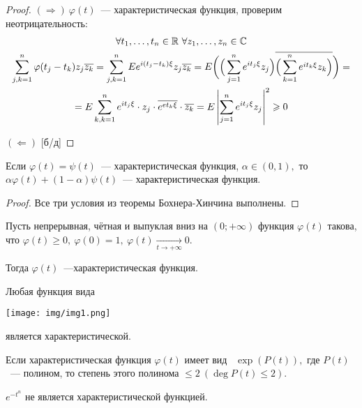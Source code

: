 	\begin{proof}
		\((\Rightarrow) ~ \varphi(t)\)~--- характеристическая функция, проверим неотрицательность:
		\begin{gather*}%
			\forall t_1, \ldots, t_n \in \R~\forall z_1, \ldots, z_n \in \mathbb{C}\\
			\sum\limits_{j, k = 1}^{n}\varphi(t_j - t_k)z_j \overline{z_k} =
			\sum\limits_{j, k = 1}^{n}Ee^{i(t_j - t_k)\xi}z_j\overline{z_k} = E\bigg(\Big(\sum\limits_{j = 1}^ne^{it_j\xi}z_j\Big)\overline{\Big(\sum\limits_{k = 1}^ne^{it_k\xi}z_k\Big)}\bigg) =\\
			= E \sum\limits_{k, k = 1}^{n}e^{it_j\xi}\cdot z_j \cdot \overline{e^{et_k\xi}}\cdot \overline{z_k} = E\left|\sum\limits_{j = 1}^{n} e^{it_j\xi}z_j\right|^2 \geqslant 0
		\end{gather*}
	
		\((\Leftarrow)\) [б/д]
	\end{proof}
	
	\begin{consequence}
		Если \(\varphi(t) = \psi(t)\)~--- характеристическая функция, \(\alpha \in (0, 1),\) то \(\alpha \varphi(t) + (1 - \alpha)\psi(t)\)~--- характеристическая функция.
	\end{consequence}
	
	\begin{proof}
		Все три условия из теоремы Бохнера-Хинчина выполнены.
	\end{proof}
	
	\begin{theorem}[Пойа(б/д)]
		Пусть непрерывная, чётная и выпуклая вниз на \((0; + \infty)\) функция \(\varphi(t)\) такова, что \(\varphi(t) \geqslant 0, ~ \varphi(0) = 1, ~\varphi(t) \underset{t \to +\infty}{\longrightarrow} 0\). 
		
		Тогда \(\varphi(t)\)~---характеристическая функция.
	\end{theorem}

	\begin{example}
		Любая функция вида
		\begin{center}
			\texttt{[image: img/img1.png]}
		\end{center}
		является характеристической.
	\end{example}

	\begin{theorem}[Марцинкевича(б/д)]
		Если характеристическая функция \(\varphi(t)\) имеет вид ~\(\exp(P(t)),\) где \(P(t)\)~--- полином, то степень этого полинома \(\leqslant 2 ~(\deg P(t) \leqslant 2).\)
	\end{theorem}
	\begin{example}
		\(e^{-t^n}\) не является характеристической функцией.
	\end{example}

